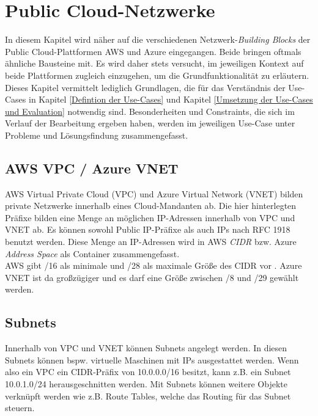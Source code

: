 \section{Public Cloud-Netzwerke}\label{public-cloud-networking}
In diesem Kapitel wird näher auf die verschiedenen Netzwerk-\textit{Building Blocks} der Public Cloud-Plattformen AWS und Azure eingegangen. Beide bringen oftmals ähnliche Bausteine mit. Es wird daher stets versucht, im jeweiligen Kontext auf beide Plattformen zugleich einzugehen, um die Grundfunktionalität zu erläutern.
Dieses Kapitel vermittelt lediglich Grundlagen, die für das Verständnis der Use-Cases in Kapitel \ref{Defintion der Use-Cases} und Kapitel \ref{Umsetzung der Use-Cases und Evaluation} notwendig sind. Besonderheiten und Constraints, die sich im Verlauf der Bearbeitung ergeben haben, werden im jeweiligen Use-Case unter \glqq Probleme und Lösungsfindung\grqq{} zusammengefasst.

\subsection{AWS VPC / Azure VNET}
AWS Virtual Private Cloud (VPC) und Azure Virtual Network (VNET) bilden private Netzwerke innerhalb eines Cloud-Mandanten ab. Die hier hinterlegten Präfixe bilden eine Menge an möglichen IP-Adressen innerhalb von VPC und VNET ab. Es können sowohl Public IP-Präfixe als auch IPs nach RFC 1918 benutzt werden. Diese Menge an IP-Adressen wird in AWS \textit{CIDR} bzw. Azure \textit{Address Space} als Container zusammengefasst.\\
AWS gibt /16 als minimale und /28 als maximale Größe des CIDR vor \cite[S.100]{awsug2020}. Azure VNET ist da großzügiger und es darf eine Größe zwischen /8 und /29 gewählt werden\cite[S.10]{Toroman2019}. 
\subsection{Subnets}
Innerhalb von VPC und VNET können Subnets angelegt werden. In diesen Subnets können bspw. virtuelle Maschinen mit IPs ausgestattet werden. Wenn also ein VPC ein CIDR-Präfix von 10.0.0.0/16 besitzt, kann z.B. ein Subnet 10.0.1.0/24 \glqq herausgeschnitten\grqq{} werden. Mit Subnets können weitere Objekte verknüpft werden wie z.B. Route Tables, welche das Routing für das Subnet steuern.

